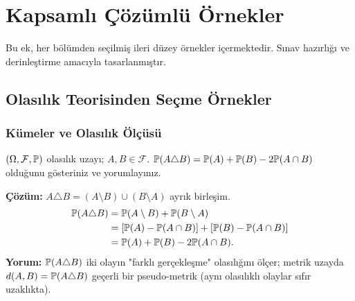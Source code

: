 \chapter{Kapsamlı Çözümlü Örnekler}
\label{app:kapsamli_ornekler}

Bu ek, her bölümden seçilmiş ileri düzey örnekler içermektedir. Sınav hazırlığı ve derinleştirme amacıyla tasarlanmıştır.

\section{Olasılık Teorisinden Seçme Örnekler}
\label{app:olasilik_ornekler}

\subsection{Kümeler ve Olasılık Ölçüsü}

\begin{ornek}
$(\Omega,\mathcal{F},\mathbb{P})$ olasılık uzayı; $A,B\in\mathcal{F}$.
$\mathbb{P}(A\triangle B) = \mathbb{P}(A)+\mathbb{P}(B)-2\mathbb{P}(A\cap B)$ olduğunu gösteriniz ve yorumlayınız.

\textbf{Çözüm:} $A\triangle B = (A\setminus B)\cup(B\setminus A)$ ayrık birleşim.
\begin{align*}
  \mathbb{P}(A\triangle B) &= \mathbb{P}(A\setminus B)+\mathbb{P}(B\setminus A) \\
  &= [\mathbb{P}(A)-\mathbb{P}(A\cap B)]+[\mathbb{P}(B)-\mathbb{P}(A\cap B)] \\
  &= \mathbb{P}(A)+\mathbb{P}(B)-2\mathbb{P}(A\cap B).
\end{align*}
\textbf{Yorum:} $\mathbb{P}(A\triangle B)$ iki olayın "farklı gerçekleşme" olasılığını ölçer; metrik uzayda $d(A,B)=\mathbb{P}(A\triangle B)$ geçerli bir pseudo-metrik (aynı olasılıklı olaylar sıfır uzaklıkta).
\end{ornek}

